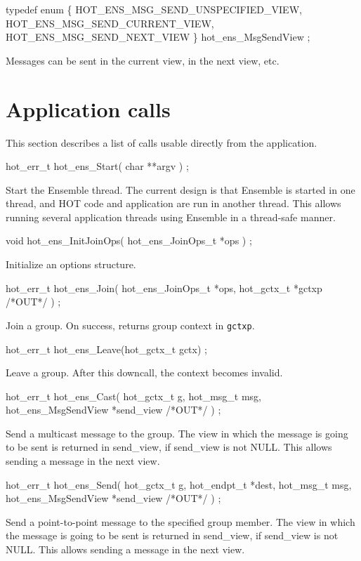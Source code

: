 \documentclass[11pt]{article}
\begin{document}
\begin{codebox}
typedef enum \{
  HOT_ENS_MSG_SEND_UNSPECIFIED_VIEW,
  HOT_ENS_MSG_SEND_CURRENT_VIEW,
  HOT_ENS_MSG_SEND_NEXT_VIEW
\} hot_ens_MsgSendView ;
\end{codebox}
Messages can be sent in the current view, in the next view, etc. 

\section{Application calls}
This section describes a list of calls usable directly from the
application. 

\begin{codebox}
hot_err_t hot_ens_Start(
  char **argv
) ;
\end{codebox}
Start the Ensemble thread. The current design is that Ensemble is
started in one thread, and HOT code and application are run in another
thread. This allows running several application threads using Ensemble
in a thread-safe manner. 

\begin{codebox}
void hot_ens_InitJoinOps(
  hot_ens_JoinOps_t *ops
) ;
\end{codebox}
Initialize an options structure. 

\begin{codebox}
hot_err_t hot_ens_Join(
  hot_ens_JoinOps_t *ops, 
  hot_gctx_t *gctxp /*OUT*/
) ;
\end{codebox}
Join a group.  On success, returns group context in {\tt *gctxp}.

\begin{codebox}
hot_err_t hot_ens_Leave(hot_gctx_t gctx) ;
\end{codebox}
Leave a group.  After this downcall, the context becomes invalid.

\begin{codebox}
hot_err_t hot_ens_Cast(
  hot_gctx_t g,
  hot_msg_t msg, 
  hot_ens_MsgSendView *send_view	/*OUT*/
) ;
\end{codebox}
Send a multicast message to the group.
The view in which the message is going to be sent
is returned in send\_view, if send\_view is not NULL.
This allows sending a message in the next view. 

\begin{codebox}
hot_err_t hot_ens_Send(
        hot_gctx_t g, 
   hot_endpt_t *dest,
   hot_msg_t msg,
   hot_ens_MsgSendView *send_view /*OUT*/
) ;
\end{codebox}
Send a point-to-point message to the specified group member.
The view in which the message is going to be sent
is returned in send\_view, if send\_view is not NULL.
This allows sending a message in the next view. 
\end{document}
